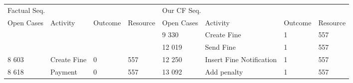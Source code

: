 \begin{tabular}{llllllll}
\toprule
\multicolumn{4}{l}{Factual Seq.} & \multicolumn{4}{l}{Our CF Seq.} \\
Open Cases & Activity & Outcome & Resource & Open Cases & Activity & Outcome & Resource \\
\midrule
 &  &  &  & 9 330 & Create Fine & 1 & 557 \\
 &  &  &  & 12 019 & Send Fine & 1 & 557 \\
8 603 & Create Fine & 0 & 557 & 12 250 & Insert Fine Notification & 1 & 557 \\
8 618 & Payment & 0 & 557 & 13 092 & Add penalty & 1 & 557 \\
\bottomrule
\end{tabular}
